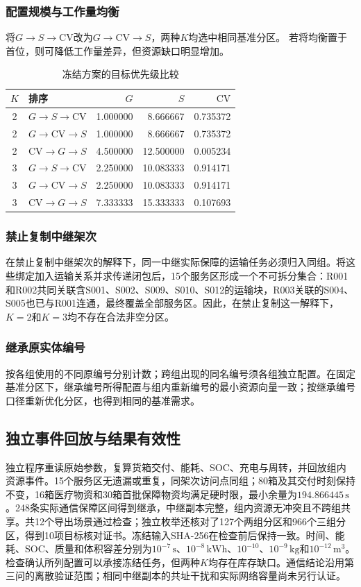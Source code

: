 \documentclass[bwprint]{gmcmthesis}
\begin{document}
\subsubsection{配置规模与工作量均衡}
将$G\to S\to\mathrm{CV}$改为$G\to\mathrm{CV}\to S$，两种$K$均选中相同基准分区。
若将均衡置于首位，则可降低工作量差异，但资源缺口明显增加。
\begin{table}[htbp]
\centering
\small
\caption{冻结方案的目标优先级比较}
\label{tab:q4_priority}
\begin{tabular}{clrrr}
\toprule
$K$ & 排序 & $G$ & $S$ & $\mathrm{CV}$ \\
\midrule
2 & $G\to S\to\mathrm{CV}$ & 1.000000 & 8.666667 & 0.735372 \\
2 & $G\to\mathrm{CV}\to S$ & 1.000000 & 8.666667 & 0.735372 \\
2 & $\mathrm{CV}\to G\to S$ & 4.500000 & 12.500000 & 0.005234 \\
3 & $G\to S\to\mathrm{CV}$ & 2.250000 & 10.083333 & 0.914171 \\
3 & $G\to\mathrm{CV}\to S$ & 2.250000 & 10.083333 & 0.914171 \\
3 & $\mathrm{CV}\to G\to S$ & 7.333333 & 15.333333 & 0.107693 \\
\bottomrule
\end{tabular}
\end{table}

\subsubsection{禁止复制中继架次}
在禁止复制中继架次的解释下，同一中继实际保障的运输任务必须归入同组。将这些绑定加入运输关系并求传递闭包后，15个服务区形成一个不可拆分集合：R001和R002共同关联含S001、S002、S009、S010、S012的运输块，R003关联的S004、S005也已与R001连通，最终覆盖全部服务区。因此，在禁止复制这一解释下，$K=2$和$K=3$均不存在合法非空分区。

\subsubsection{继承原实体编号}
按各组使用的不同原编号分别计数；跨组出现的同名编号须各组独立配置。在固定基准分区下，继承编号所得配置与组内重新编号的最小资源向量一致；按继承编号口径重新优化分区，也得到相同的基准需求。

\subsection{独立事件回放与结果有效性}
独立程序重读原始参数，复算货箱交付、能耗、SOC、充电与周转，并回放组内资源事件。15个服务区无遗漏或重复，同架次访问点同组；80箱及其交付时刻保持不变，16箱医疗物资和30箱首批保障物资均满足硬时限，最小余量为$194.866445\,\mathrm{s}$。248条实际通信保障区间得到继承，中继副本完整，组内资源无冲突且不跨组共享。共12个导出场景通过检查；独立枚举还核对了127个两组分区和966个三组分区，得到10项目标核对证书。冻结输入SHA-256在检查前后保持一致。时间、能耗、SOC、质量和体积容差分别为$10^{-7}\,\mathrm{s}$、$10^{-8}\,\mathrm{kWh}$、$10^{-10}$、$10^{-9}\,\mathrm{kg}$和$10^{-12}\,\mathrm{m^3}$。检查确认所列配置可以承接冻结任务，但两种$K$均存在库存缺口。通信结论沿用第三问的离散验证范围；相同中继副本的共址干扰和实际网络容量尚未另行认证。
\end{document}
